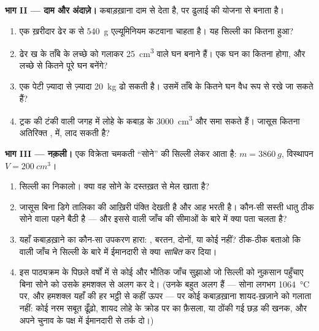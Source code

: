 \begin{problem}
\medskip\noindent\textbf{भाग II --- दाम और अंदाज़े।}
कबाड़ख़ाना दाम  से देता है, पर ढुलाई की योजना  से बनाता है।
\begin{enumerate}[resume]
  \item एक ख़रीदार ढेर क से \qty{540}{g} एल्यूमिनियम कटवाना चाहता
        है। यह सिल्ली का कितना  हुआ?
  \item ढेर ख के ताँबे के लच्छे को गलाकर \qty{25}{cm^3} वाले घन
        बनाने हैं। एक घन का  कितना होगा, और लच्छे से कितने
        पूरे घन बनेंगे?
  \item एक पेटी ज़्यादा से ज़्यादा \qty{20}{kg} ढो सकती है। उसमें
        ताँबे के कितने घन वैध रूप से रखे जा सकते हैं?
  \item ट्रक की टंकी वाली जगह में लोहे के कबाड़ के \qty{3000}{cm^3}
        और समा सकते हैं। जासूस कितना अतिरिक्त , 
        में, लाद सकती है?
\end{enumerate}

\medskip\noindent\textbf{भाग III --- नक़ली।}
एक विक्रेता चमकती ``सोने'' की सिल्ली लेकर आता है:
$m = \qty{3860}{g}$, विस्थापन $V = \qty{200}{cm^3}$।
\begin{enumerate}[resume]
  \item सिल्ली का  निकालो। क्या वह सोने के दस्तख़त से मेल खाता
        है?
  \item जासूस बिना डिगे तालिका की आख़िरी पंक्ति देखती है और आह भरती
        है। कौन-सी सस्ती धातु ठीक सोने वाला  पहने बैठी है ---
        और इससे  वाली जाँच की सीमाओं के बारे में क्या पता चलता
        है?
  \item यहाँ कबाड़ख़ाने का कौन-सा उपकरण हारा: , बरतन, दोनों, या
        कोई नहीं? ठीक-ठीक बताओ कि  वाली जाँच ने सिल्ली के बारे
        में ईमानदारी से क्या \emph{साबित} कर दिया।
  \item इस पाठ्यक्रम के पिछले वर्षों में से कोई और भौतिक जाँच सुझाओ
        जो सिल्ली को नुक़सान पहुँचाए बिना सोने को उसके हमशक्ल से अलग
        कर दे। (उनके  बहुत अलग हैं --- सोना लगभग
        \qty{1064}{\celsius} पर, और हमशक्ल यहाँ की हर भट्ठी से कहीं
        ऊपर --- पर कोई कबाड़ख़ाना शायद-ख़ज़ाने को गलाता नहीं: कोई
        नरम सबूत ढूँढ़ो, शायद लोहे के क्रोड पर  का फ़ैसला, या
        ठोंकी गई छड़ की खनक, और अपने चुनाव के पक्ष में ईमानदारी से
        तर्क दो।)
\end{enumerate}


\end{problem}
